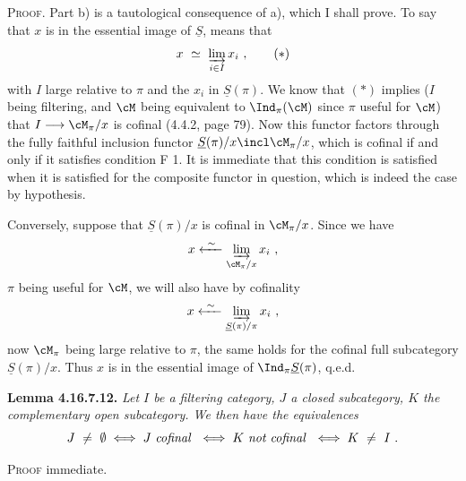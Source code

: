 \noindent\textsc{Proof}. Part b) is a tautological consequence of a), which I shall prove. To say that $x$ is in the essential image of $\underline{S}$, means that
\[
x \ \simeq \ \varinjlim_{i\in I} x_i \ , \tag*{$(*)$}
\]
with $I$ large relative to $\pi$ and the $x_i$ in $\underline{S}(\pi)$. We know that $(*)$ implies ($I$ being filtering, and $\cM$ being equivalent to $\Ind_\pi(\cM)$ since $\pi$ useful for $\cM$) that $I\longrightarrow\cM_\pi/x$ is cofinal (4.4.2, page 79). Now this functor factors through the fully faithful inclusion functor $\underline{S}(\pi)/x\incl\cM_\pi/x$, which is cofinal if and only if it satisfies condition F 1. It is immediate that this condition is satisfied when it is satisfied for the composite functor in question, which is indeed the case
by hypothesis.

\noindent Conversely, suppose that $\underline{S}(\pi)/x$ is cofinal in $\cM_\pi/x$. Since we have
\[
x \xleftarrow{\ \sim\ } \varinjlim_{\cM_\pi/x} x_i \ ,
\]
$\pi$ being useful for $\cM$, we will also have by cofinality
\[
x \xleftarrow{\ \sim\ } \varinjlim_{\underline{S}(\pi)/\pi} x_i \ , %
\]
now $\cM_\pi$ being large relative to $\pi$, the same holds for the cofinal full subcategory $\underline{S}(\pi)/x$. Thus $x$ is in the essential image of $\Ind_\pi\underline{S}(\pi)$, q.e.d.

\noindent\textbf{Lemma 4.16.7.12.} \textit{Let $I$ be a filtering category, $J$ a closed subcategory, $K$ the complementary open subcategory. We then have the equivalences}
\[
J \ \neq \ \emptyset \iff J \text{ \textit{cofinal} } \iff K \text{ \textit{not cofinal} } \iff K \ \neq \ I \ .
\]

\noindent\textsc{Proof} immediate.

